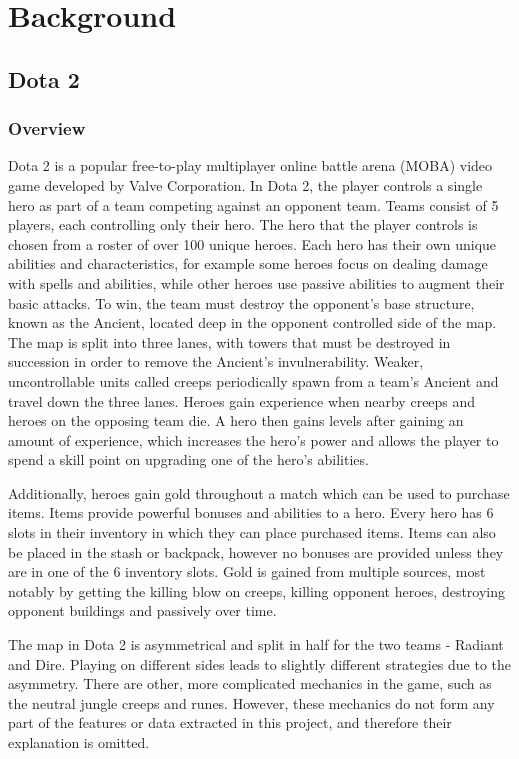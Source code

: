 \documentclass[Report.tex]{subfiles}
\begin{document}
\section{Background}

\subsection{Dota 2}
\subsubsection{Overview}
Dota 2 is a popular free-to-play multiplayer online battle arena (MOBA) video game developed by Valve Corporation. In Dota 2, the player controls a single hero as part of a team competing against an opponent team. Teams consist of 5 players, each controlling only their hero. The hero that the player controls is chosen from a roster of over 100 unique heroes. Each hero has their own unique abilities and characteristics, for example some heroes focus on dealing damage with spells and abilities, while other heroes use passive abilities to augment their basic attacks. To win, the team must destroy the opponent's base structure, known as the Ancient, located deep in the opponent controlled side of the map. The map is split into three lanes, with towers that must be destroyed in succession in order to remove the Ancient's invulnerability. Weaker, uncontrollable units called creeps periodically spawn from a team's Ancient and travel down the three lanes. Heroes gain experience when nearby creeps and heroes on the opposing team die. A hero then gains levels after gaining an amount of experience, which increases the hero's power and allows the player to spend a skill point on upgrading one of the hero's abilities. 

Additionally, heroes gain gold throughout a match which can be used to purchase items. Items provide powerful bonuses and abilities to a hero. Every hero has 6 slots in their inventory in which they can place purchased items. Items can also be placed in the stash or backpack, however no bonuses are provided unless they are in one of the 6 inventory slots. Gold is gained from multiple sources, most notably by getting the killing blow on creeps, killing opponent heroes, destroying opponent buildings and passively over time. 


The map in Dota 2 is asymmetrical and split in half for the two teams - Radiant and Dire. Playing on different sides leads to slightly different strategies due to the asymmetry. There are other, more complicated mechanics in the game, such as the neutral jungle creeps and runes. However, these mechanics do not form any part of the features or data extracted in this project, and therefore their explanation is omitted. 
\end{document}
